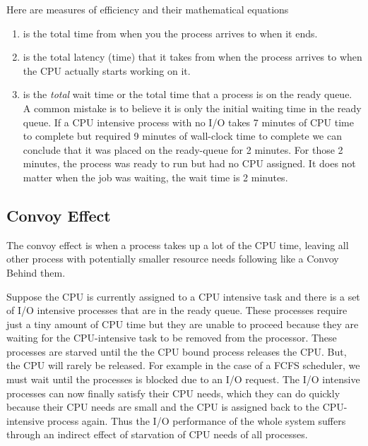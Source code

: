 Here are measures of efficiency and their mathematical equations

\begin{enumerate}
\item {} is the total time from when you the process arrives to when it ends.
  \item {} is the total latency (time) that it takes from when the process arrives to when the CPU actually starts working on it.
  \item {} is the \emph{total} wait time or the total time that a process is on the ready queue.
    A common mistake is to believe it is only the initial waiting time in the ready queue.
    If a CPU intensive process with no I/O takes 7 minutes of CPU time to complete but required 9 minutes of wall-clock time to complete we can conclude that it was placed on the ready-queue for 2 minutes.
    For those 2 minutes, the process was ready to run but had no CPU assigned.
    It does not matter when the job was waiting, the wait time is 2 minutes.

\end{enumerate}

\subsection{Convoy Effect}

The convoy effect is when a process takes up a lot of the CPU time, leaving all other process with potentially smaller resource needs following like a Convoy Behind them.

Suppose the CPU is currently assigned to a CPU intensive task and there is a set of I/O intensive processes that are in the ready queue.
These processes require just a tiny amount of CPU time but they are unable to proceed because they are waiting for the CPU-intensive task to be removed from the processor.
These processes are starved until the the CPU bound process releases the CPU.
But, the CPU will rarely be released.
For example in the case of a FCFS scheduler, we must wait until the processes is blocked due to an I/O request.
The I/O intensive processes can now finally satisfy their CPU needs, which they can do quickly because their CPU needs are small and the CPU is assigned back to the CPU-intensive process again.
Thus the I/O performance of the whole system suffers through an indirect effect of starvation of CPU needs of all processes.

